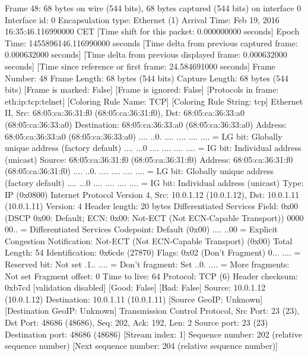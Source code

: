 Frame 48: 68 bytes on wire (544 bits), 68 bytes captured (544 bits) on interface 0
    Interface id: 0
    Encapsulation type: Ethernet (1)
    Arrival Time: Feb 19, 2016 16:35:46.116990000 CET
    [Time shift for this packet: 0.000000000 seconds]
    Epoch Time: 1455896146.116990000 seconds
    [Time delta from previous captured frame: 0.000632000 seconds]
    [Time delta from previous displayed frame: 0.000632000 seconds]
    [Time since reference or first frame: 24.584691000 seconds]
    Frame Number: 48
    Frame Length: 68 bytes (544 bits)
    Capture Length: 68 bytes (544 bits)
    [Frame is marked: False]
    [Frame is ignored: False]
    [Protocols in frame: eth:ip:tcp:telnet]
    [Coloring Rule Name: TCP]
    [Coloring Rule String: tcp]
Ethernet II, Src: 68:05:ca:36:31:f0 (68:05:ca:36:31:f0), Dst: 68:05:ca:36:33:a0 (68:05:ca:36:33:a0)
    Destination: 68:05:ca:36:33:a0 (68:05:ca:36:33:a0)
        Address: 68:05:ca:36:33:a0 (68:05:ca:36:33:a0)
        .... ..0. .... .... .... .... = LG bit: Globally unique address (factory default)
        .... ...0 .... .... .... .... = IG bit: Individual address (unicast)
    Source: 68:05:ca:36:31:f0 (68:05:ca:36:31:f0)
        Address: 68:05:ca:36:31:f0 (68:05:ca:36:31:f0)
        .... ..0. .... .... .... .... = LG bit: Globally unique address (factory default)
        .... ...0 .... .... .... .... = IG bit: Individual address (unicast)
    Type: IP (0x0800)
Internet Protocol Version 4, Src: 10.0.1.12 (10.0.1.12), Dst: 10.0.1.11 (10.0.1.11)
    Version: 4
    Header length: 20 bytes
    Differentiated Services Field: 0x00 (DSCP 0x00: Default; ECN: 0x00: Not-ECT (Not ECN-Capable Transport))
        0000 00.. = Differentiated Services Codepoint: Default (0x00)
        .... ..00 = Explicit Congestion Notification: Not-ECT (Not ECN-Capable Transport) (0x00)
    Total Length: 54
    Identification: 0x6cde (27870)
    Flags: 0x02 (Don't Fragment)
        0... .... = Reserved bit: Not set
        .1.. .... = Don't fragment: Set
        ..0. .... = More fragments: Not set
    Fragment offset: 0
    Time to live: 64
    Protocol: TCP (6)
    Header checksum: 0xb7cd [validation disabled]
        [Good: False]
        [Bad: False]
    Source: 10.0.1.12 (10.0.1.12)
    Destination: 10.0.1.11 (10.0.1.11)
    [Source GeoIP: Unknown]
    [Destination GeoIP: Unknown]
Transmission Control Protocol, Src Port: 23 (23), Dst Port: 48686 (48686), Seq: 202, Ack: 192, Len: 2
    Source port: 23 (23)
    Destination port: 48686 (48686)
    [Stream index: 1]
    Sequence number: 202    (relative sequence number)
    [Next sequence number: 204    (relative sequence number)]
